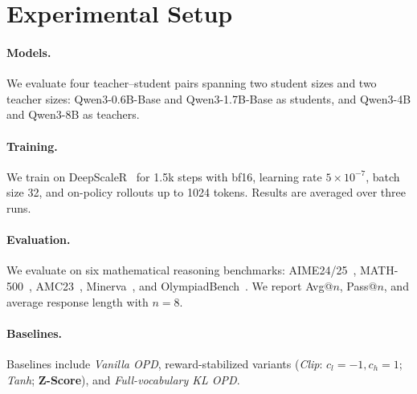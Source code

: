 \section{Experimental Setup}
\label{subsec:experimental-setup}



\paragraph{Models.}
We evaluate four teacher--student pairs spanning two student sizes and two teacher sizes: Qwen3-0.6B-Base and Qwen3-1.7B-Base as students, and Qwen3-4B and Qwen3-8B as teachers.

\paragraph{Training.}
We train on DeepScaleR~\citep{deepscaler2025} for 1.5k steps with bf16, learning rate \(5\times10^{-7}\), batch size 32, and on-policy rollouts up to 1024 tokens. Results are averaged over three runs.

\paragraph{Evaluation.}
We evaluate on six mathematical reasoning benchmarks: AIME24/25~\citep{maa_aime}, MATH-500~\citep{hendrycks2021math}, AMC23~\citep{maa_amc}, Minerva~\citep{minerva}, and OlympiadBench~\citep{OlympiadBench}. We report Avg@\(n\), Pass@\(n\), and average response length with \(n=8\).

\paragraph{Baselines.}
Baselines include \emph{Vanilla OPD}, reward-stabilized variants (\emph{Clip}: \(c_l=-1,c_h=1\); \emph{Tanh}; \textbf{Z-Score}), and \emph{Full-vocabulary KL OPD}.
